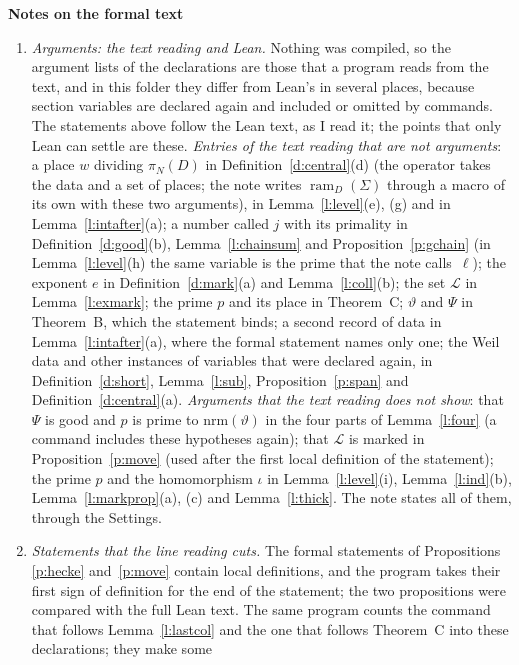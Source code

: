 \documentclass[11pt,a4paper]{article}
\newcommand{\sect}[2]{\refstepcounter{section}\label{#2}\par\addvspace{19pt plus 4pt minus 2pt}\Needspace{7\baselineskip}%
  \noindent\llap{{\fontsize{13.2}{16}\selectfont\bfseries\color{inkfaint}\thesection}\hspace{9pt}}%
  {\fontsize{13.2}{16}\selectfont\bfseries\color{ink}#1}\par\nopagebreak\vspace{-1pt}}
\theoremstyle{plainx}
\theoremstyle{uprightx}
\newcommand{\piN}[1]{\pi_N(#1)}
\newcommand{\nrm}[1]{\mathrm{nrm}(#1)}
\newcommand{\ramop}[2]{\operatorname{ram}_{#1}(#2)}
\begin{document}
\sect{Notes on the formal text}{s:notes}
\begin{enumerate}[label=\textup{\arabic*.},leftmargin=1.6em,itemsep=5pt]
\item \emph{Arguments: the text reading and Lean.} Nothing was compiled, so the argument lists of the
declarations are those that a program reads from the text, and in this folder they differ from Lean's in
several places, because section variables are declared again and included or omitted by commands. The
statements above follow the Lean text, as I read it; the points that only Lean can settle are these.
\emph{Entries of the text reading that are not arguments}: a place $w$ dividing $\piN{D}$ in
Definition~\ref{d:central}(d) (the operator takes the data and a set of places; the note writes
$\ramop{D}{\Sigma}$ through a macro of its own with these two arguments), in Lemma~\ref{l:level}(e), (g) and in
Lemma~\ref{l:intafter}(a); a number called $j$ with its primality in Definition~\ref{d:good}(b),
Lemma~\ref{l:chainsum} and Proposition~\ref{p:gchain} (in Lemma~\ref{l:level}(h) the same variable is the prime
that the note calls~$\ell$); the exponent $e$ in Definition~\ref{d:mark}(a) and Lemma~\ref{l:coll}(b); the set
$\mathcal{L}$ in Lemma~\ref{l:exmark}; the prime $p$ and its place in Theorem~C; $\vartheta$ and $\Psi$ in
Theorem~B, which the statement binds; a second record of data in Lemma~\ref{l:intafter}(a), where the formal
statement names only one; the Weil data and other instances of variables that were declared again, in
Definition~\ref{d:short}, Lemma~\ref{l:sub}, Proposition~\ref{p:span} and Definition~\ref{d:central}(a).
\emph{Arguments that the text reading does not show}: that $\Psi$ is good and $p$ is prime to
$\nrm{\vartheta}$ in the four parts of Lemma~\ref{l:four} (a command includes these hypotheses again); that
$\mathcal{L}$ is marked in Proposition~\ref{p:move} (used after the first local definition of the statement);
the prime $p$ and the homomorphism $\iota$ in Lemma~\ref{l:level}(i), Lemma~\ref{l:ind}(b),
Lemma~\ref{l:markprop}(a), (c) and Lemma~\ref{l:thick}. The note states all of them, through the Settings.
\item \emph{Statements that the line reading cuts.} The formal statements of Propositions \ref{p:hecke}
and~\ref{p:move} contain local definitions, and the program takes their first sign of definition for the end of
the statement; the two propositions were compared with the full Lean text. The same program counts the command
that follows Lemma~\ref{l:lastcol} and the one that follows Theorem~C into these declarations; they make some

\end{enumerate}
\end{document}
